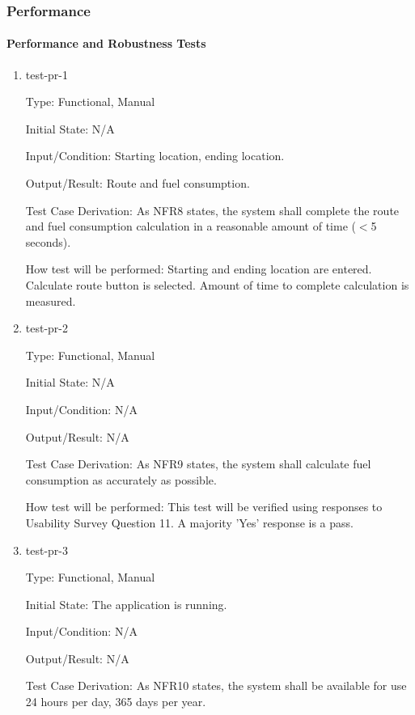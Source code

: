 \documentclass[12pt, titlepage]{article}
\begin{document}
\subsubsection{Performance}

\paragraph{Performance and Robustness Tests}

\begin{enumerate}

\item{test-pr-1\\}

Type: Functional, Manual

Initial State: N/A

Input/Condition: Starting location, ending location.

Output/Result: Route and fuel consumption.

Test Case Derivation: As NFR8 states, the system shall complete the route and fuel consumption calculation in a reasonable amount of time ($<$5 seconds).

How test will be performed: Starting and ending location are entered. Calculate route button is selected. Amount of time to complete calculation is measured. 

\item{test-pr-2\\}

Type: Functional, Manual

Initial State: N/A	

Input/Condition: N/A

Output/Result: N/A

Test Case Derivation: As NFR9 states, the system shall calculate fuel consumption as accurately as possible.

How test will be performed: This test will be verified using responses to Usability Survey Question 11. A majority 'Yes' response is a pass.

\item{test-pr-3\\}

Type: Functional, Manual

Initial State: The application is running. 

Input/Condition: N/A

Output/Result: N/A

Test Case Derivation: As NFR10 states, the system shall be available for use 24 hours per day, 365 days per year.


\end{enumerate}
\end{document}
